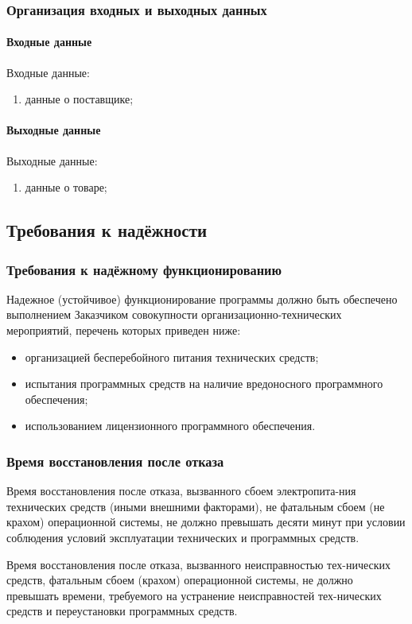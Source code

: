 \documentclass[14pt]{extarticle}        %
\begin{document}
\subsubsection{Организация входных и выходных данных}
\paragraph{Входные данные}
Входные данные:
    \begin{enumerate}
        \item данные о поставщике;
    \end{enumerate}

\paragraph{Выходные данные}
Выходные данные:
    \begin{enumerate}
        \item данные о товаре;
    \end{enumerate}
    
\subsection{Требования к надёжности}  
\subsubsection{Требования к надёжному функционированию}
Надежное (устойчивое) функционирование программы должно быть обеспечено выполнением Заказчиком совокупности организационно-технических мероприятий, перечень которых приведен ниже:
\begin{itemize}
    \item организацией бесперебойного питания технических средств;
    \item испытания программных средств на наличие вредоносного программного обеспечения;
    \item использованием лицензионного программного обеспечения.
\end{itemize}

\subsubsection {Время восстановления после отказа}   
Время восстановления после отказа, вызванного сбоем электропита-ния технических средств (иными внешними факторами), не фатальным сбоем (не крахом) операционной системы, не должно превышать десяти минут при условии соблюдения условий эксплуатации технических и программных средств.\par
Время восстановления после отказа, вызванного неисправностью тех-нических средств, фатальным сбоем (крахом) операционной системы, не должно превышать времени, требуемого на устранение неисправностей тех-нических средств и переустановки программных средств.
\end{document}
